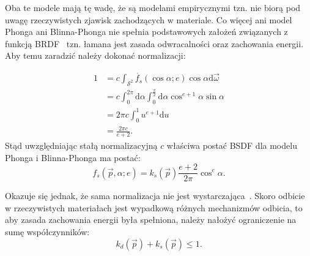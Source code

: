 
Oba te modele mają tę wadę, że są modelami empirycznymi tzn. nie biorą pod uwagę rzeczywistych zjawisk zachodzących w materiale. Co więcej ani model Phonga ani Blinna-Phonga nie spełnia podstawowych założeń związanych z funkcją BRDF~\cite{Lewis94makingshaders} tzn. łamana jest zasada odwracalności oraz zachowania energii. Aby temu zaradzić należy dokonać normalizacji:

\begin{align}
1 &= c\int_{\mathcal{S}^2}\acute{f_s}(\cos\alpha; e)\cos\alpha\mathrm{d}\vec{\omega}\nonumber\\
&= c\int_0^{2\pi}\mathrm{d}\alpha\int_0^{\frac{\pi}{2}}\mathrm{d}\alpha\cos^{e + 1}\alpha\sin\alpha\nonumber\\
&= 2\pi c\int_0^1 u^{e + 1}\mathrm{d}u\nonumber\\
&= \frac{2\pi c}{e + 2}.
\end{align}
Stąd uwzględniając stałą normalizacyjną $c$ właściwa postać BSDF dla modelu Phonga i Blinna-Phonga ma postać:
\begin{equation}
f_s(\vec{p}, \alpha; e) = k_s(\vec{p})\frac{e + 2}{2\pi}\cos^e\alpha.
\label{ch1:eq:PhongBRDFNormalized}
\end{equation}

Okazuje się jednak, że sama normalizacja nie jest wystarczająca~\cite{Lafortune94usingthe}. Skoro odbicie w rzeczywistych materiałach jest wypadkową różnych mechanizmów odbicia, to aby zasada zachowania energii była spełniona, należy nałożyć ograniczenie na sumę współczynników:
\begin{equation}
k_d(\vec{p}) + k_s(\vec{p}) \leq 1.
\end{equation}

